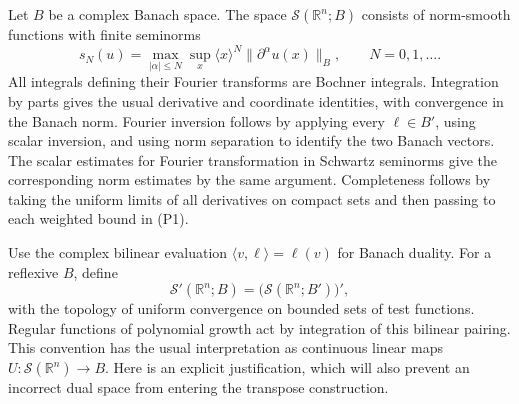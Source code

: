 \documentclass[
  11pt,
]{article}
\begin{document}
Let \(B\) be a complex Banach space. The space
\(\mathcal S(\mathbb R^n;B)\) consists of norm-smooth functions with
finite seminorms \[
 s_N(u)=\max_{|\alpha|\leq N}\sup_x
 \langle x\rangle^N\|\partial^\alpha u(x)\|_B,
 \qquad N=0,1,\ldots.
\tag{P1}
\] All integrals defining their Fourier transforms are Bochner
integrals. Integration by parts gives the usual derivative and
coordinate identities, with convergence in the Banach norm. Fourier
inversion follows by applying every \(\ell\in B'\), using scalar
inversion, and using norm separation to identify the two Banach vectors.
The scalar estimates for Fourier transformation in Schwartz seminorms
give the corresponding norm estimates by the same argument. Completeness
follows by taking the uniform limits of all derivatives on compact sets
and then passing to each weighted bound in (P1).

Use the complex bilinear evaluation \(\langle v,\ell\rangle=\ell(v)\)
for Banach duality. For a reflexive \(B\), define \[
 \mathcal S'(\mathbb R^n;B)
 =\bigl(\mathcal S(\mathbb R^n;B')\bigr)',
\tag{P2}
\] with the topology of uniform convergence on bounded sets of test
functions. Regular functions of polynomial growth act by integration of
this bilinear pairing. This convention has the usual interpretation as
continuous linear maps \(U:\mathcal S(\mathbb R^n)\to B\). Here is an
explicit justification, which will also prevent an incorrect dual space
from entering the transpose construction.
\end{document}
